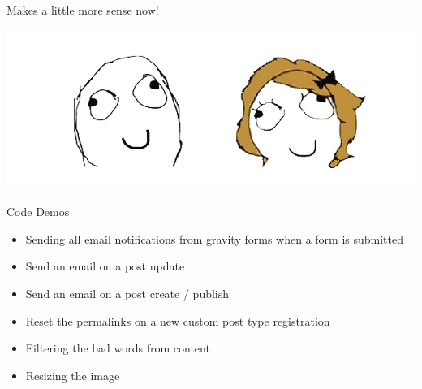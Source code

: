 \documentclass[10pt]{beamer}
\begin{document}
    \begin{frame}
        \begin{center}
            \begin{Huge}
                Makes a little more sense now!
            \end{Huge}

            \vfill{}
            \includegraphics[width=1\textwidth]{images/sense}
        \end{center}
    \end{frame}

    \begin{frame}{Code Demos}
        \begin{itemize}
            \item Sending all email notifications from gravity forms when a form is submitted
            \item Send an email on a post update
            \item Send an email on a post create / publish
            \item Reset the permalinks on a new custom post type registration 
            \item Filtering the bad words from content
            \item Resizing the image
        \end{itemize}
    \end{frame}

    \begin{frame}
        
    \end{frame}

    \begin{frame}
        
    \end{frame}

    \begin{frame}
        
    \end{frame}
    
    \begin{frame}
        
    \end{frame}
\end{document}
